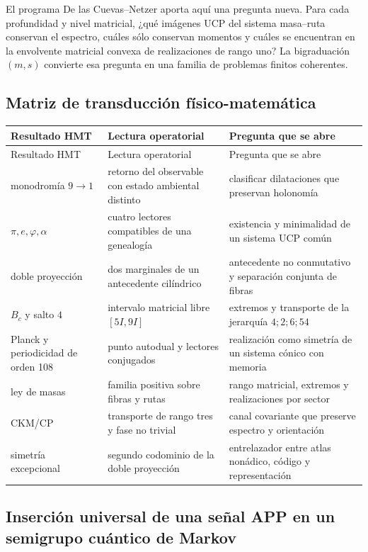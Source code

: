 El programa De las Cuevas--Netzer aporta aquí una pregunta nueva. Para cada
profundidad y nivel matricial, ¿qué imágenes UCP del sistema masa--ruta
conservan el espectro, cuáles sólo conservan momentos y cuáles se encuentran
en la envolvente matricial convexa de realizaciones de rango uno? La
bigraduación $(m,s)$ convierte esa pregunta en una familia de problemas
finitos coherentes.

\subsection{Matriz de transducción físico-matemática}

\begin{longtable}{@{}L{.23\textwidth}L{.31\textwidth}L{.36\textwidth}@{}}
\toprule
Resultado HMT & Lectura operatorial & Pregunta que se abre\\
\midrule
\endfirsthead
\toprule
Resultado HMT & Lectura operatorial & Pregunta que se abre\\
\midrule
\endhead
monodromía $9\to1$ & retorno del observable con estado ambiental distinto &
clasificar dilataciones que preservan holonomía\\
$\pi,e,\varphi,\alpha$ & cuatro lectores compatibles de una genealogía &
existencia y minimalidad de un sistema UCP común\\
doble proyección & dos marginales de un antecedente cilíndrico &
antecedente no conmutativo y separación conjunta de fibras\\
$B_c$ y salto $4$ & intervalo matricial libre $[5I,9I]$ &
extremos y transporte de la jerarquía $4;2;6;54$\\
Planck y periodicidad de orden 108 & punto autodual y lectores conjugados &
realización como simetría de un sistema cónico con memoria\\
ley de masas & familia positiva sobre fibras y rutas &
rango matricial, extremos y realizaciones por sector\\
CKM/CP & transporte de rango tres y fase no trivial &
canal covariante que preserve espectro y orientación\\
simetría excepcional & segundo codominio de la doble proyección &
entrelazador entre atlas nonádico, código y representación\\
\bottomrule
\end{longtable}

\subsection{Inserción universal de una señal APP en un semigrupo cuántico de Markov}

